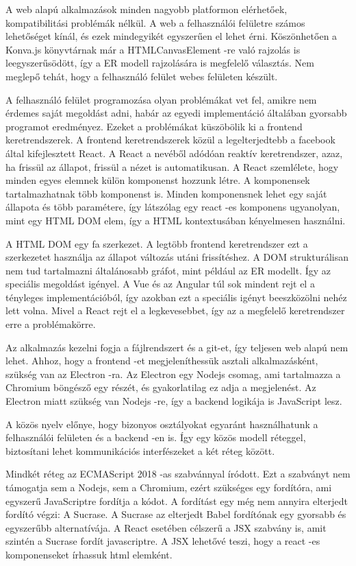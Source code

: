 \documentclass[a4paper,12pt,oneside]{report}
\begin{document}
\begin{justify}

	A web alapú alkalmazások minden nagyobb platformon elérhetőek, kompatibilitási problémák nélkül. A web a felhasználói felületre számos lehetőséget kínál, és ezek mindegyikét egyszerűen el lehet érni. Köszönhetően a Konva.js könyvtárnak már a HTMLCanvasElement -re való rajzolás is leegyszerűsödött, így a ER modell rajzolására is megfelelő választás. Nem meglepő tehát, hogy a felhasználó felület webes felületen készült. 

	A felhasználó felület programozása olyan problémákat vet fel, amikre nem érdemes saját megoldást adni, habár az egyedi implementáció általában gyorsabb programot eredményez. Ezeket a problémákat küszöbölik ki a frontend keretrendszerek. A frontend keretrendszerek közül a legelterjedtebb a facebook által kifejlesztett React. A React a nevéből adódóan reaktív keretrendszer, azaz, ha frissül az állapot, frissül a nézet is automatikusan. A React szemlélete, hogy minden egyes elemnek külön komponenst hozzunk létre. A komponensek tartalmazhatnak több komponenst is. Minden komponensnek lehet egy saját állapota és több paramétere, így látszólag egy react -es komponens ugyanolyan, mint egy HTML DOM elem, így a HTML kontextusában kényelmesen használni.

	A HTML DOM egy fa szerkezet. A legtöbb frontend keretrendszer ezt a szerkezetet használja az állapot változás utáni frissítéshez. A DOM strukturálisan nem tud tartalmazni általánosabb gráfot, mint például az ER modellt. Így az speciális megoldást igényel. A Vue és az Angular túl sok mindent rejt el a tényleges implementációból, így azokban ezt a speciális igényt beeszközölni nehéz lett volna. Mivel a React rejt el a legkevesebbet, így az a megfelelő keretrendszer erre a problémakörre.

	Az alkalmazás kezelni fogja a fájlrendszert és a git-et, így teljesen web alapú nem lehet. Ahhoz, hogy a frontend -et megjeleníthessük asztali alkalmazásként, szükség van az Electron -ra. Az Electron egy Nodejs csomag, ami tartalmazza a Chromium böngésző egy részét, és gyakorlatilag ez adja a megjelenést. Az Electron miatt szükség van Nodejs -re, így a backend logikája is JavaScript lesz.

	A közös nyelv előnye, hogy bizonyos osztályokat egyaránt használhatunk a felhasználói felületen és a backend -en is. Így egy közös modell réteggel, biztosítani lehet kommunikációs interfészeket a két réteg között. 

	Mindkét réteg az ECMAScript 2018 -as szabvánnyal íródott. Ezt a szabványt nem támogatja sem a Nodejs, sem a Chromium, ezért szükséges egy fordítóra, ami egyszerű JavaScriptre fordítja a kódot. A fordítást egy még nem annyira elterjedt fordító végzi: A Sucrase. A Sucrase az elterjedt Babel fordítónak egy gyorsabb és egyszerűbb alternatívája. A React esetében célszerű a JSX szabvány is, amit szintén a Sucrase fordít javascriptre. A JSX lehetővé teszi, hogy a react -es komponenseket írhassuk html elemként.


\end{justify}
\newpage
\end{document}
